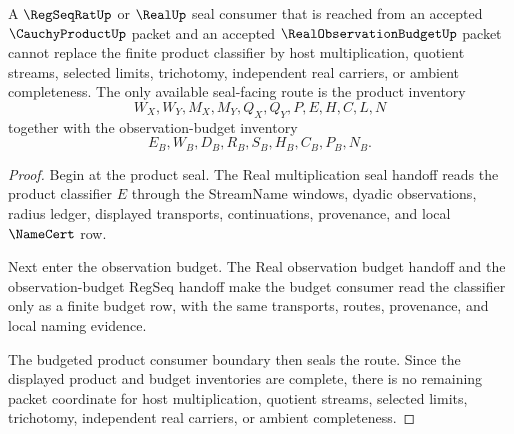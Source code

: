 \begin{theorem}
\label{thm:cauchy-product-regseq-seal-nonescape}
A $\RegSeqRatUp$ or $\RealUp$ seal consumer that is reached from an accepted $\CauchyProductUp$ packet and an accepted $\RealObservationBudgetUp$ packet cannot replace the finite product classifier by host multiplication, quotient streams, selected limits, trichotomy, independent real carriers, or ambient completeness. The only available seal-facing route is the product inventory
$$
W_X,W_Y,M_X,M_Y,Q_X,Q_Y,P,E,H,C,L,N
$$
together with the observation-budget inventory
$$
E_B,W_B,D_B,R_B,S_B,H_B,C_B,P_B,N_B.
$$
\end{theorem}
\begin{proof}
Begin at the product seal. The Real multiplication seal handoff reads the product classifier $E$ through the StreamName windows, dyadic observations, radius ledger, displayed transports, continuations, provenance, and local $\NameCert$ row.

Next enter the observation budget. The Real observation budget handoff and the observation-budget RegSeq handoff make the budget consumer read the classifier only as a finite budget row, with the same transports, routes, provenance, and local naming evidence.

The budgeted product consumer boundary then seals the route. Since the displayed product and budget inventories are complete, there is no remaining packet coordinate for host multiplication, quotient streams, selected limits, trichotomy, independent real carriers, or ambient completeness.
\end{proof}

